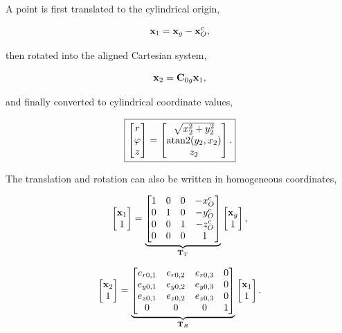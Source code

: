 A point is first translated to the cylindrical origin,

\begin{equation}
    \mathbf{x}_1=\mathbf{x}_g-\mathbf{x}_O^c,
\end{equation}

then rotated into the aligned Cartesian system,

\begin{equation}
    \mathbf{x}_2=\mathbf{C}_{0g}\mathbf{x}_1,
\end{equation}

and finally converted to cylindrical coordinate values,

\begin{equation}
    \boxed{
    \begin{bmatrix}r\\\varphi\\z\end{bmatrix}
    =
    \begin{bmatrix}
        \sqrt{x_2^2+y_2^2}\\
        \operatorname{atan2}(y_2,x_2)\\
        z_2
    \end{bmatrix}.}
\end{equation}

The translation and rotation can also be written in homogeneous coordinates,

\begin{equation}
    \begin{bmatrix}\mathbf{x}_1\\1\end{bmatrix}
    =
    \underbrace{
    \begin{bmatrix}
      1&0&0&-x_O^c\\
      0&1&0&-y_O^c\\
      0&0&1&-z_O^c\\
      0&0&0&1
    \end{bmatrix}}_{\mathbf{T}_T}
    \begin{bmatrix}\mathbf{x}_g\\1\end{bmatrix},
\end{equation}

\begin{equation}
    \begin{bmatrix}\mathbf{x}_2\\1\end{bmatrix}
    =
    \underbrace{
    \begin{bmatrix}
      e_{r0,1}&e_{r0,2}&e_{r0,3}&0\\
      e_{y0,1}&e_{y0,2}&e_{y0,3}&0\\
      e_{z0,1}&e_{z0,2}&e_{z0,3}&0\\
      0&0&0&1
    \end{bmatrix}}_{\mathbf{T}_R}
    \begin{bmatrix}\mathbf{x}_1\\1\end{bmatrix}.
\end{equation}

